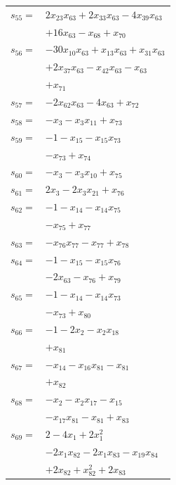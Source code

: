 \begin{longtable}{@{}r@{\;}l@{}}
\(s_{55}=\) & \(\displaystyle 2x_{23}x_{63} +2x_{33}x_{63} -4x_{39}x_{63}\) \\
 & \(\displaystyle +16x_{63} -x_{68} +x_{70}\) \\[3pt]
\(s_{56}=\) & \(\displaystyle -30x_{10}x_{63} +x_{13}x_{63} +x_{31}x_{63}\) \\
 & \(\displaystyle +2x_{37}x_{63} -x_{42}x_{63} -x_{63}\) \\
 & \(\displaystyle +x_{71}\) \\[3pt]
\(s_{57}=\) & \(\displaystyle -2x_{62}x_{63} -4x_{63} +x_{72}\) \\[3pt]
\(s_{58}=\) & \(\displaystyle -x_{3} -x_{3}x_{11} +x_{73}\) \\[3pt]
\(s_{59}=\) & \(\displaystyle -1 -x_{15} -x_{15}x_{73}\) \\
 & \(\displaystyle -x_{73} +x_{74}\) \\[3pt]
\(s_{60}=\) & \(\displaystyle -x_{3} -x_{3}x_{10} +x_{75}\) \\[3pt]
\(s_{61}=\) & \(\displaystyle 2x_{3} -2x_{3}x_{21} +x_{76}\) \\[3pt]
\(s_{62}=\) & \(\displaystyle -1 -x_{14} -x_{14}x_{75}\) \\
 & \(\displaystyle -x_{75} +x_{77}\) \\[3pt]
\(s_{63}=\) & \(\displaystyle -x_{76}x_{77} -x_{77} +x_{78}\) \\[3pt]
\(s_{64}=\) & \(\displaystyle -1 -x_{15} -x_{15}x_{76}\) \\
 & \(\displaystyle -2x_{63} -x_{76} +x_{79}\) \\[3pt]
\(s_{65}=\) & \(\displaystyle -1 -x_{14} -x_{14}x_{73}\) \\
 & \(\displaystyle -x_{73} +x_{80}\) \\[3pt]
\(s_{66}=\) & \(\displaystyle -1 -2x_{2} -x_{2}x_{18}\) \\
 & \(\displaystyle +x_{81}\) \\[3pt]
\(s_{67}=\) & \(\displaystyle -x_{14} -x_{16}x_{81} -x_{81}\) \\
 & \(\displaystyle +x_{82}\) \\[3pt]
\(s_{68}=\) & \(\displaystyle -x_{2} -x_{2}x_{17} -x_{15}\) \\
 & \(\displaystyle -x_{17}x_{81} -x_{81} +x_{83}\) \\[3pt]
\(s_{69}=\) & \(\displaystyle 2 -4x_{1} +2x_{1}^{2}\) \\
 & \(\displaystyle -2x_{1}x_{82} -2x_{1}x_{83} -x_{19}x_{84}\) \\
 & \(\displaystyle +2x_{82} +x_{82}^{2} +2x_{83}\) \\

\end{longtable}
